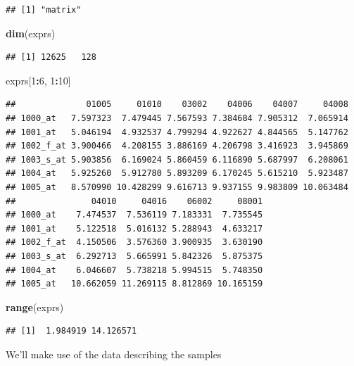 \documentclass[]{article}
\newenvironment{Shaded}{\begin{snugshade}}{\end{snugshade}}
\newcommand{\KeywordTok}[1]{\textcolor[rgb]{0.13,0.29,0.53}{\textbf{#1}}}
\newcommand{\DecValTok}[1]{\textcolor[rgb]{0.00,0.00,0.81}{#1}}
\newcommand{\OperatorTok}[1]{\textcolor[rgb]{0.81,0.36,0.00}{\textbf{#1}}}
\newcommand{\NormalTok}[1]{#1}
\theoremstyle{definition}
\theoremstyle{definition}
\theoremstyle{remark}
\begin{document}
\begin{verbatim}
## [1] "matrix"
\end{verbatim}

\begin{Shaded}
\begin{Highlighting}[]
\KeywordTok{dim}\NormalTok{(exprs)}
\end{Highlighting}
\end{Shaded}

\begin{verbatim}
## [1] 12625   128
\end{verbatim}

\begin{Shaded}
\begin{Highlighting}[]
\NormalTok{exprs[}\DecValTok{1}\OperatorTok{:}\DecValTok{6}\NormalTok{, }\DecValTok{1}\OperatorTok{:}\DecValTok{10}\NormalTok{]}
\end{Highlighting}
\end{Shaded}

\begin{verbatim}
##              01005     01010    03002    04006    04007     04008
## 1000_at   7.597323  7.479445 7.567593 7.384684 7.905312  7.065914
## 1001_at   5.046194  4.932537 4.799294 4.922627 4.844565  5.147762
## 1002_f_at 3.900466  4.208155 3.886169 4.206798 3.416923  3.945869
## 1003_s_at 5.903856  6.169024 5.860459 6.116890 5.687997  6.208061
## 1004_at   5.925260  5.912780 5.893209 6.170245 5.615210  5.923487
## 1005_at   8.570990 10.428299 9.616713 9.937155 9.983809 10.063484
##               04010     04016    06002     08001
## 1000_at    7.474537  7.536119 7.183331  7.735545
## 1001_at    5.122518  5.016132 5.288943  4.633217
## 1002_f_at  4.150506  3.576360 3.900935  3.630190
## 1003_s_at  6.292713  5.665991 5.842326  5.875375
## 1004_at    6.046607  5.738218 5.994515  5.748350
## 1005_at   10.662059 11.269115 8.812869 10.165159
\end{verbatim}

\begin{Shaded}
\begin{Highlighting}[]
\KeywordTok{range}\NormalTok{(exprs)}
\end{Highlighting}
\end{Shaded}

\begin{verbatim}
## [1]  1.984919 14.126571
\end{verbatim}

We'll make use of the data describing the samples
\end{document}
